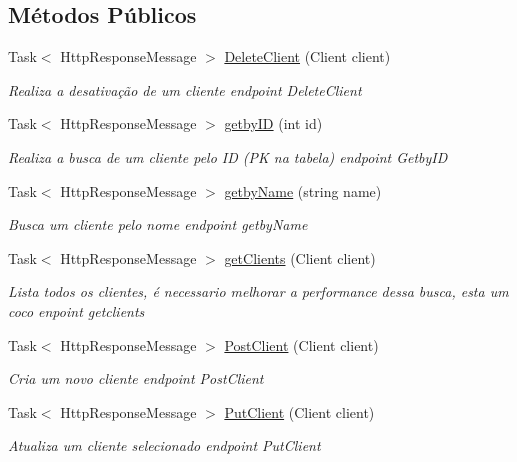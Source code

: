 \subsection*{Métodos Públicos}
\begin{DoxyCompactItemize}
\item 
Task$<$ Http\+Response\+Message $>$ \hyperlink{classApi3Layers_1_1Controllers_1_1ClientController_a9313f9369acc70d20109a5e2621486fd}{Delete\+Client} (Client client)
\begin{DoxyCompactList}\small\item\em Realiza a desativação de um cliente endpoint Delete\+Client \end{DoxyCompactList}\item 
Task$<$ Http\+Response\+Message $>$ \hyperlink{classApi3Layers_1_1Controllers_1_1ClientController_a63543b21b5d71a250f5c2e251e1725eb}{getby\+ID} (int id)
\begin{DoxyCompactList}\small\item\em Realiza a busca de um cliente pelo ID (PK na tabela) endpoint Getby\+ID \end{DoxyCompactList}\item 
Task$<$ Http\+Response\+Message $>$ \hyperlink{classApi3Layers_1_1Controllers_1_1ClientController_a6d76d1f7034cfdf7e36f0b2f47c61019}{getby\+Name} (string name)
\begin{DoxyCompactList}\small\item\em Busca um cliente pelo nome endpoint getby\+Name \end{DoxyCompactList}\item 
Task$<$ Http\+Response\+Message $>$ \hyperlink{classApi3Layers_1_1Controllers_1_1ClientController_acd6322615b0779aafdbef5f44517f329}{get\+Clients} (Client client)
\begin{DoxyCompactList}\small\item\em Lista todos os clientes, é necessario melhorar a performance dessa busca, esta um coco enpoint getclients \end{DoxyCompactList}\item 
Task$<$ Http\+Response\+Message $>$ \hyperlink{classApi3Layers_1_1Controllers_1_1ClientController_a05f7ee98b8ff74ab142860e21b1f8350}{Post\+Client} (Client client)
\begin{DoxyCompactList}\small\item\em Cria um novo cliente endpoint Post\+Client \end{DoxyCompactList}\item 
Task$<$ Http\+Response\+Message $>$ \hyperlink{classApi3Layers_1_1Controllers_1_1ClientController_ad9896ffbab1cde391410a4685f44f0f6}{Put\+Client} (Client client)
\begin{DoxyCompactList}\small\item\em Atualiza um cliente selecionado endpoint Put\+Client \end{DoxyCompactList}\end{DoxyCompactItemize}
